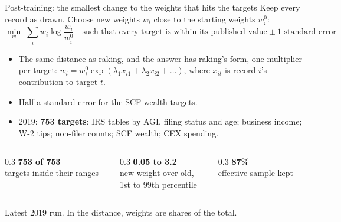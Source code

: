 \documentclass[11pt,aspectratio=169]{beamer}
\newcommand{\slidenote}[1]{\par\vfill{\scriptsize\color{yalegrey}#1}}
\begin{document}
\begin{frame}{Post-training: the smallest change to the weights that hits the targets}
  \small
  Keep every record as drawn. Choose new weights $w_i$ close to the starting weights $w^0_i$:
  \[
    \min_{w}\; \sum_i w_i \log\frac{w_i}{w^0_i}
    \quad\text{such that every target is within its published value} \pm 1 \text{ standard error}
  \]
  \vspace{-0.6em}
  \begin{itemize}
    \item The same distance as raking, and the answer has raking's form, one multiplier per target:
          $w_i = w^0_i \exp(\lambda_1 x_{i1} + \lambda_2 x_{i2} + \dots)$, where $x_{it}$ is record $i$'s
          contribution to target $t$.
    \item Half a standard error for the SCF wealth targets.
    \item 2019: \textbf{753 targets}: IRS tables by AGI, filing status and age; business income;
          W-2 tips; non-filer counts; SCF wealth; CEX spending.
  \end{itemize}
  \begin{columns}[T]
    \begin{column}{0.3\textwidth}\centering
      {\Large\bfseries\color{yaleblue} 753 of 753}\\ \scriptsize targets inside their ranges
    \end{column}
    \begin{column}{0.3\textwidth}\centering
      {\Large\bfseries\color{yaleblue} 0.05 to 3.2}\\ \scriptsize new weight over old,\\ \scriptsize 1st to 99th percentile
    \end{column}
    \begin{column}{0.3\textwidth}\centering
      {\Large\bfseries\color{yaleblue} 87\%}\\ \scriptsize effective sample kept
    \end{column}
  \end{columns}
  \slidenote{Latest 2019 run. In the distance, weights are shares of the total.}
\end{frame}

\end{document}
